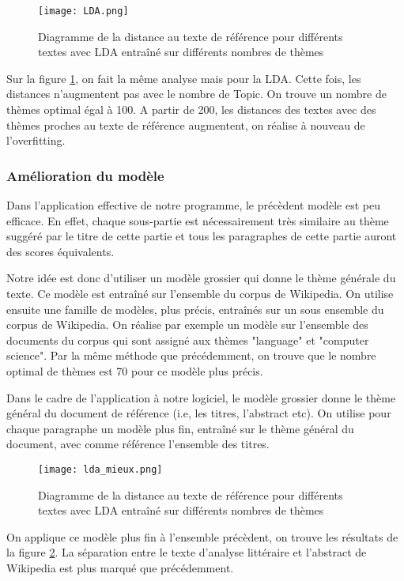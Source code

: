 \documentclass[12pt]{article}
\begin{document}
\begin{figure}
    \label{lda}
    \caption{Diagramme de la distance au texte de référence pour différents textes avec LDA entraîné sur différents nombres de thèmes}
    \texttt{[image: LDA.png]}
\end{figure}

\noindent
Sur la figure \ref{lda}, on fait la même analyse mais pour la LDA. Cette fois, les distances n'augmentent pas avec le nombre de Topic. On trouve un nombre de thèmes optimal égal à 100. A partir de 200, les distances des textes avec des thèmes proches au texte de référence augmentent, on réalise à nouveau de l'overfitting.




\subsubsection{Amélioration du modèle}
\noindent
Dans l'application effective de notre programme, le précèdent modèle est peu efficace. En effet, chaque sous-partie est nécessairement très similaire au thème suggéré par le titre de cette partie et tous les paragraphes de cette partie auront des scores équivalents.

\noindent
Notre idée est donc d'utiliser un modèle grossier qui donne le thème générale du texte. Ce modèle est entraîné sur l'ensemble du corpus de Wikipedia. On utilise ensuite une famille de modèles, plus précis, entraînés sur un sous ensemble du corpus de Wikipedia. On réalise par exemple un modèle sur l'ensemble des documents du corpus qui sont assigné aux thèmes "language" et "computer science". Par la même méthode que précédemment, on trouve que le nombre optimal de thèmes est 70 pour ce modèle plus précis.

\noindent
Dans le cadre de l'application à notre logiciel, le modèle grossier donne le thème général du document de référence (i.e, les titres, l'abstract etc). On utilise pour chaque paragraphe  un modèle plus fin, entraîné sur le thème général du document, avec comme référence l'ensemble des titres.

\begin{figure}
    \centering
    \texttt{[image: lda\_mieux.png]}
    \caption{Diagramme de la distance au texte de référence pour différents textes avec LDA entraîné sur différents nombres de thèmes}
    \label{mod+}
\end{figure}

\noindent
On applique ce modèle plus fin à l'ensemble précèdent, on trouve les résultats de la figure \ref{mod+}. La séparation entre le texte d'analyse littéraire et l'abstract de Wikipedia est plus marqué que précédemment. 
\end{document}
